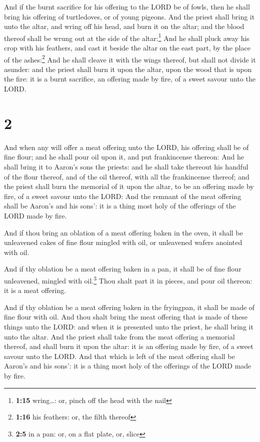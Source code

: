  And if the burnt sacrifice for his offering to the LORD
be of fowls, then he shall bring his offering of turtledoves, or of
young pigeons.  And the priest shall bring it unto the
altar, and wring off his head, and burn it on the altar; and the blood
thereof shall be wrung out at the side of the altar:\footnote{\textbf{1:15}
  wring\ldots: or, pinch off the head with the nail}  And
he shall pluck away his crop with his feathers, and cast it beside the
altar on the east part, by the place of the ashes:\footnote{\textbf{1:16}
  his feathers: or, the filth thereof}  And he shall
cleave it with the wings thereof, but shall not divide it asunder: and
the priest shall burn it upon the altar, upon the wood that is upon the
fire: it is a burnt sacrifice, an offering made by fire, of a sweet
savour unto the LORD.

\hypertarget{section-1}{%
\section{2}\label{section-1}}

 And when any will offer a meat offering unto the LORD,
his offering shall be of fine flour; and he shall pour oil upon it, and
put frankincense thereon:  And he shall bring it to
Aaron's sons the priests: and he shall take thereout his handful of the
flour thereof, and of the oil thereof, with all the frankincense
thereof; and the priest shall burn the memorial of it upon the altar, to
be an offering made by fire, of a sweet savour unto the LORD:
 And the remnant of the meat offering shall be Aaron's and
his sons': it is a thing most holy of the offerings of the LORD made by
fire.

 And if thou bring an oblation of a meat offering baken in
the oven, it shall be unleavened cakes of fine flour mingled with oil,
or unleavened wafers anointed with oil.

 And if thy oblation be a meat offering baken in a pan, it
shall be of fine flour unleavened, mingled with oil.\footnote{\textbf{2:5}
  in a pan: or, on a flat plate, or, slice}  Thou shalt
part it in pieces, and pour oil thereon: it is a meat offering.

 And if thy oblation be a meat offering baken in the
fryingpan, it shall be made of fine flour with oil.  And
thou shalt bring the meat offering that is made of these things unto the
LORD: and when it is presented unto the priest, he shall bring it unto
the altar.  And the priest shall take from the meat
offering a memorial thereof, and shall burn it upon the altar: it is an
offering made by fire, of a sweet savour unto the LORD. 
And that which is left of the meat offering shall be Aaron's and his
sons': it is a thing most holy of the offerings of the LORD made by
fire.

